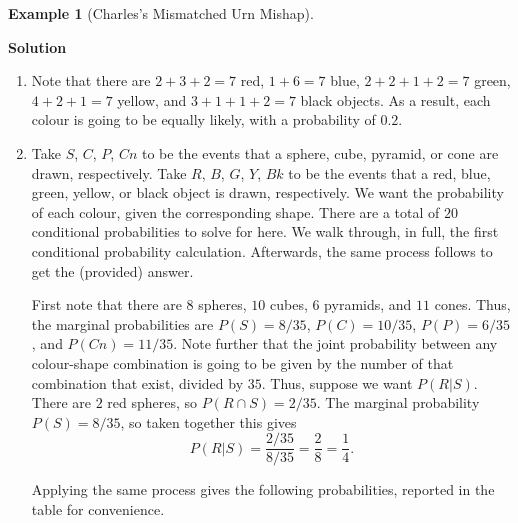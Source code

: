 \documentclass[
  letterpaper,
  DIV=11,
  numbers=noendperiod]{scrreprt}
\theoremstyle{definition}
\theoremstyle{definition}
\theoremstyle{definition}
\newtheorem{example}{Example}[chapter]
\theoremstyle{remark}
\begin{document}
\begin{example}[Charles's Mismatched Urn
Mishap]
\begin{tcolorbox}[enhanced jigsaw, colback=white, breakable, rightrule=.15mm, leftrule=.75mm, toprule=.15mm, left=2mm, arc=.35mm, opacityback=0, bottomrule=.15mm]

\vspace{-3mm}\textbf{Solution}\vspace{3mm}

\begin{enumerate}
\def\labelenumi{\alph{enumi}.}
\item
  Note that there are \(2+3+2=7\) red, \(1+6=7\) blue, \(2+2+1+2=7\)
  green, \(4+2+1=7\) yellow, and \(3+1+1+2=7\) black objects. As a
  result, each colour is going to be equally likely, with a probability
  of \(0.2\).
\item
  Take \(S\), \(C\), \(P\), \(Cn\) to be the events that a sphere, cube,
  pyramid, or cone are drawn, respectively. Take \(R\), \(B\), \(G\),
  \(Y\), \(Bk\) to be the events that a red, blue, green, yellow, or
  black object is drawn, respectively. We want the probability of each
  colour, given the corresponding shape. There are a total of \(20\)
  conditional probabilities to solve for here. We walk through, in full,
  the first conditional probability calculation. Afterwards, the same
  process follows to get the (provided) answer.

  First note that there are \(8\) spheres, \(10\) cubes, \(6\) pyramids,
  and \(11\) cones. Thus, the marginal probabilities are
  \(P(S) = 8/35\), \(P(C) = 10/35\), \(P(P) = 6/35\), and
  \(P(Cn) = 11/35\). Note further that the joint probability between any
  colour-shape combination is going to be given by the number of that
  combination that exist, divided by \(35\). Thus, suppose we want
  \(P(R|S)\). There are \(2\) red spheres, so \(P(R \cap S) = 2/35\).
  The marginal probability \(P(S) = 8/35\), so taken together this gives
  \[P(R|S) = \frac{2/35}{8/35} = \frac{2}{8} = \frac{1}{4}.\]

  Applying the same process gives the following probabilities, reported
  in the table for convenience.


\end{enumerate}
\end{tcolorbox}
\end{example}
\end{document}
